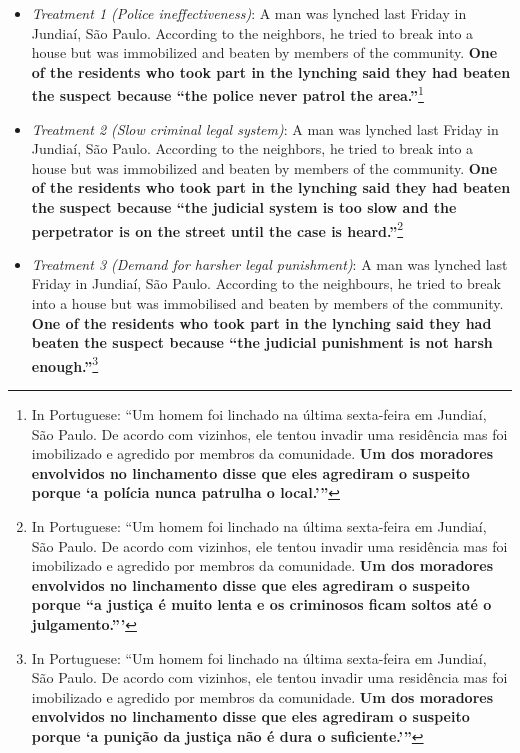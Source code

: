 \documentclass[12pt,a4paper]{article}
\providecommand{\tightlist}{%
   \setlength{\itemsep}{0pt}\setlength{\parskip}{0pt}}
\begin{document}
\begin{itemize}
\tightlist
\item
  \emph{Treatment 1 (Police ineffectiveness)}: A man was lynched last Friday in Jundiaí, São Paulo. According to the neighbors, he tried to break into a house but was immobilized and beaten by members of the community. \textbf{One of the residents who took part in the lynching said they had beaten the suspect because ``the police never patrol the area.''}\footnote{In Portuguese: ``Um homem foi linchado na última sexta-feira em Jundiaí, São Paulo. De acordo com vizinhos, ele tentou invadir uma residência mas foi imobilizado e agredido por membros da comunidade. \textbf{Um dos moradores envolvidos no linchamento disse que eles agrediram o suspeito porque `a polícia nunca patrulha o local.'''}}
\end{itemize}

\begin{itemize}
\tightlist
\item
  \emph{Treatment 2 (Slow criminal legal system)}: A man was lynched last Friday in Jundiaí, São Paulo. According to the neighbors, he tried to break into a house but was immobilized and beaten by members of the community. \textbf{One of the residents who took part in the lynching said they had beaten the suspect because ``the judicial system is too slow and the perpetrator is on the street until the case is heard.''}\footnote{In Portuguese: ``Um homem foi linchado na última sexta-feira em Jundiaí, São Paulo. De acordo com vizinhos, ele tentou invadir uma residência mas foi imobilizado e agredido por membros da comunidade. \textbf{Um dos moradores envolvidos no linchamento disse que eles agrediram o suspeito porque ``a justiça é muito lenta e os criminosos ficam soltos até o julgamento.'''}}
\end{itemize}

\begin{itemize}
\tightlist
\item
  \emph{Treatment 3 (Demand for harsher legal punishment)}: A man was lynched last Friday in Jundiaí, São Paulo. According to the neighbours, he tried to break into a house but was immobilised and beaten by members of the community. \textbf{One of the residents who took part in the lynching said they had beaten the suspect because ``the judicial punishment is not harsh enough.''}\footnote{In Portuguese: ``Um homem foi linchado na última sexta-feira em Jundiaí, São Paulo. De acordo com vizinhos, ele tentou invadir uma residência mas foi imobilizado e agredido por membros da comunidade. \textbf{Um dos moradores envolvidos no linchamento disse que eles agrediram o suspeito porque `a punição da justiça não é dura o suficiente.'''}}
\end{itemize}
\end{document}
